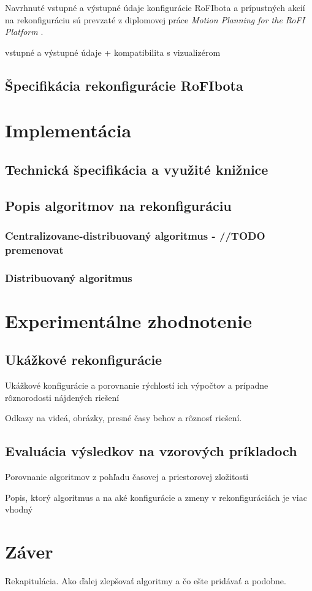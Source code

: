 \documentclass[
  digital, %
  twoside, %
  table,   %
  nolof,     %
  nolot,     %
]{fithesis3}
\begin{document}
Navrhnuté vstupné a výstupné údaje konfigurácie RoFIbota a prípustných akcií na rekonfiguráciu sú prevzaté z diplomovej práce \textit{Motion Planning for the RoFI Platform} \cite{vozarovaMasterThesis}. 

\cite{nausovaBachelorThesis}

vstupné a výstupné údaje + kompatibilita s vizualizérom

\section{Špecifikácia rekonfigurácie RoFIbota}
\label{sec:reconfigActions}


\chapter{Implementácia}
\label{sec:implementation}
\section{Technická špecifikácia a využité knižnice}
\label{sec:libraries}
\section{Popis algoritmov na rekonfiguráciu}
\label{sec:algoDesc}
\subsection{Centralizovane-distribuovaný algoritmus - //TODO premenovat}
\subsection{Distribuovaný algoritmus}

\chapter{Experimentálne zhodnotenie}
\section{Ukážkové rekonfigurácie}
Ukážkové konfigurácie a porovnanie rýchlostí ich výpočtov a prípadne rôznorodosti nájdených riešení

Odkazy na videá, obrázky, presné časy behov a rôznosť riešení. 
\section{Evaluácia výsledkov na vzorových príkladoch}
Porovnanie algoritmov z pohľadu časovej a priestorovej zložitosti

Popis, ktorý algoritmus a na aké konfigurácie a zmeny v rekonfiguráciách je viac vhodný

\chapter{Záver}
Rekapitulácia. 
Ako ďalej zlepšovať algoritmy a čo ešte pridávať a podobne. 

  \printbibliography[heading=bibintoc] %
\end{document}
